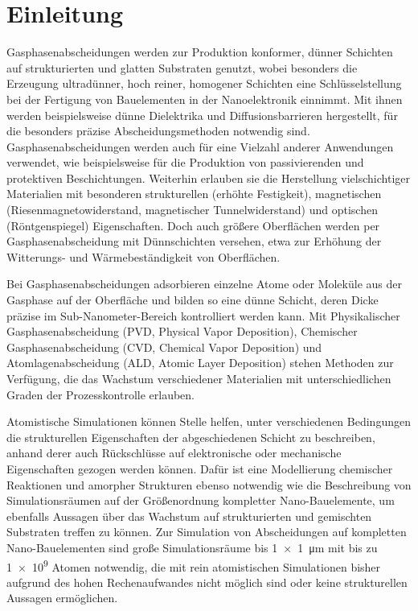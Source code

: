 \chapter{Einleitung}
\label{intro}

Gasphasenabscheidungen werden zur Produktion konformer, dünner Schichten auf strukturierten und glatten Substraten genutzt, wobei besonders die Erzeugung ultradünner, hoch reiner, homogener Schichten eine Schlüsselstellung bei der Fertigung von Bauelementen in der Nanoelektronik einnimmt.
Mit ihnen werden beispielsweise dünne Dielektrika und Diffusionsbarrieren hergestellt, für die besonders präzise Abscheidungsmethoden notwendig sind.
Gasphasenabscheidungen werden auch für eine Vielzahl anderer Anwendungen verwendet, wie beispielsweise für die Produktion von passivierenden und protektiven Beschichtungen.
Weiterhin erlauben sie die Herstellung vielschichtiger Materialien mit besonderen strukturellen (erhöhte Festigkeit), magnetischen (Riesenmagnetowiderstand, magnetischer Tunnelwiderstand) und optischen (Röntgenspiegel) Eigenschaften.
Doch auch größere Oberflächen werden per Gasphasenabscheidung mit Dünnschichten versehen, etwa zur Erhöhung der Witterungs- und Wärmebeständigkeit von Oberflächen.

Bei Gasphasenabscheidungen adsorbieren einzelne Atome oder Moleküle aus der Gasphase auf der Oberfläche und bilden so eine dünne Schicht, deren Dicke präzise im Sub-Nanometer-Bereich kontrolliert werden kann.
Mit Physikalischer Gasphasenabscheidung (PVD, Physical Vapor Deposition), Chemischer Gasphasenabscheidung (CVD, Chemical Vapor Deposition) und Atomlagenabscheidung (ALD, Atomic Layer Deposition) stehen Methoden zur Verfügung, die das Wachstum verschiedener Materialien mit unterschiedlichen Graden der Prozesskontrolle erlauben.

Atomistische Simulationen können Stelle helfen, unter verschiedenen Bedingungen die strukturellen Eigenschaften der abgeschiedenen Schicht zu beschreiben, anhand derer auch Rückschlüsse auf elektronische oder mechanische Eigenschaften gezogen werden können.
Dafür ist eine Modellierung chemischer Reaktionen und amorpher Strukturen ebenso notwendig wie die Beschreibung von Simulationsräumen auf der Größenordnung kompletter Nano-Bauelemente, um ebenfalls Aussagen über das Wachstum auf strukturierten und gemischten Substraten treffen zu können.
Zur Simulation von Abscheidungen auf kompletten Nano-Bauelementen sind große Simulationsräume bis \SI{1x1}{\micro\meter} mit bis zu \num{1e9} Atomen notwendig, die mit rein atomistischen Simulationen bisher aufgrund des hohen Rechenaufwandes nicht möglich sind oder keine strukturellen Aussagen ermöglichen.

